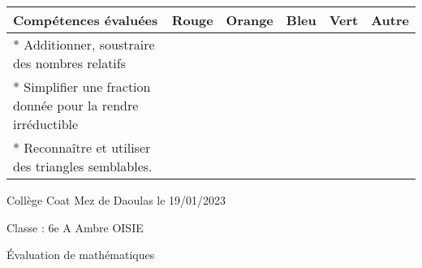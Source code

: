 \documentclass[a4paper,12pt,fleqn]{article}
\begin{document}
\begin{footnotesize}

\begin{center}

\begin{tabular}{|p{120mm}|p{8mm}|p{10mm}|p{8mm}|p{8mm}|p{8mm}|}

\hline
\textbf{Compétences évaluées} & \textbf{Rouge} & \textbf{Orange} & \textbf{Bleu} & \textbf{Vert} & \textbf{Autre} \\
\hline


*  Additionner, soustraire des nombres relatifs  & & & & & \\ 
\hline
*  Simplifier une fraction donnée pour la rendre irréductible  & & & & & \\ 
\hline
*  Reconnaître et utiliser des triangles semblables.  & & & & & \\ 
\hline
\end{tabular}
\end{center}
\end{footnotesize}
 \par 
\medskip
 \par 
\medskip
 \par 
\medskip
\newpage
\setcounter{exo}{0}


Collège Coat Mez de Daoulas  \hfill  le 19/01/2023

Classe : 6e A \hfill Ambre OISIE

\begin{center}
\begin{LARGE} Évaluation de mathématiques \end{LARGE}
\end{center}

\end{document}
